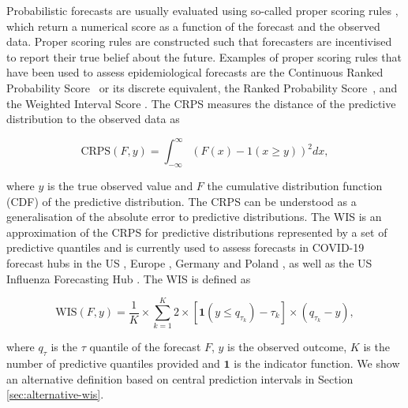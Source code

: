\documentclass{article}
\begin{document}
Probabilistic forecasts are usually evaluated using so-called proper scoring rules \citep{gneitingStrictlyProperScoring2007}, which return a numerical score as a function of the forecast and the observed data. Proper scoring rules are constructed such that forecasters are incentivised to report their true belief about the future. Examples of proper scoring rules that have been used to assess epidemiological forecasts are the Continuous Ranked Probability Score~\citep[CRPS,][]{gneitingStrictlyProperScoring2007} or its discrete equivalent, the Ranked Probability Score~\citep[RPS,][]{funkAssessingPerformanceRealtime2019}, and the Weighted Interval Score \citep{bracherEvaluatingEpidemicForecasts2021}. 
The CRPS measures the distance of the predictive distribution to the observed data as 
\begin{linenomath*}
\begin{equation*}
    \text{CRPS}(F, y) = \int_{-\infty}^\infty \left( F(x) - 1(x \geq y) \right)^2 dx,
\end{equation*}    
\end{linenomath*}
where $y$ is the true observed value and $F$ the cumulative distribution function (CDF) of the predictive distribution. The CRPS can be understood as a generalisation of the absolute error to predictive distributions. The WIS is an approximation of the CRPS for predictive distributions represented by a set of predictive quantiles and is currently used to assess forecasts in COVID-19 forecast hubs in the US \citep{cramerCOVID19ForecastHub2020, cramerEvaluationIndividualEnsemble2021}, Europe \citep{sherrattPredictivePerformanceMultimodel2022}, Germany and Poland \citep{bracherShorttermForecastingCOVID192021, bracherNationalSubnationalShortterm2021}, as well as the US Influenza Forecasting Hub \citep{CdcepiFlusightforecastdata2022}. The WIS is defined as 
\begin{linenomath*}
\begin{equation*}
    \text{WIS}(F, y) = \frac{1}{K} \times \sum_{k = 1}^{K} 2 \times \left[ \boldsymbol{1}(y \leq q_{\tau_k}) - \tau_k \right] \times ( q_{\tau_k} - y), 
\end{equation*}
\end{linenomath*}
where $q_{\tau}$ is the $\tau$ quantile of the forecast $F$, $y$ is the observed outcome, $K$ is the number of predictive quantiles provided and $\boldsymbol{1}$ is the indicator function. We show an alternative definition based on central prediction intervals in Section \ref{sec:alternative-wis}.
\end{document}
